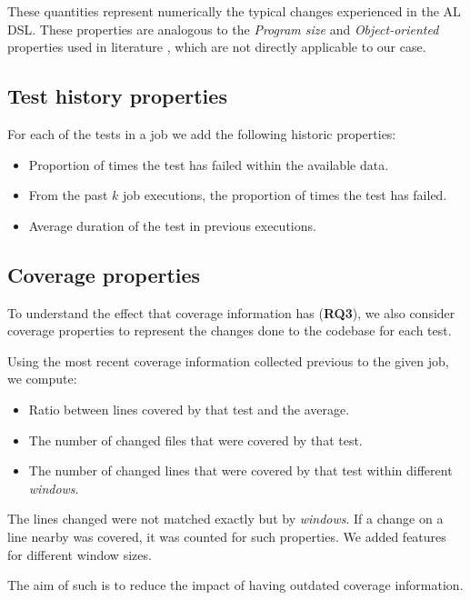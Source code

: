 These quantities represent numerically the typical changes experienced in the AL DSL. These properties are analogous to
the \emph{Program size} and \emph{Object-oriented} properties used in literature \cite{Bertolino2020LearningtoRankVR}\cite{Busjaeger2016LearningFT},
which are not directly applicable to our case.

\subsection{Test history properties}

For each of the tests in a job we add the following historic properties:

\begin{itemize}
    \item Proportion of times the test has failed within the available data.
    \item From the past $k$ job executions, the proportion of times the test has failed.
    \item Average duration of the test in previous executions.
\end{itemize}

\subsection{Coverage properties}
To understand the effect that coverage information has (\textbf{RQ3}), we also consider coverage properties
to represent the changes done to the codebase for each test.

Using the most recent coverage information collected previous to the given job, we compute:
\begin{itemize}
    \item Ratio between lines covered by that test and the average.
    \item The number of changed files that were covered by that test.
    \item The number of changed lines that were covered by that test within different \emph{windows}.
\end{itemize}

The lines changed were not matched exactly but by \emph{windows}. If a change on a
line nearby was covered, it was counted for such properties. We added features for
different window sizes.

The aim of such is to reduce the impact of having outdated coverage information.